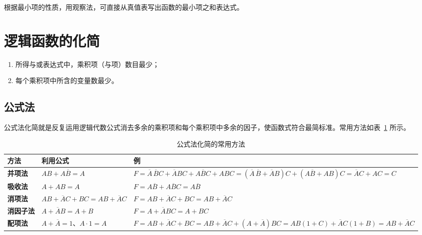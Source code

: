\begin{keybox}[方法]
	根据最小项的性质，用观察法，可直接从真值表写出函数的最小项之和表达式。
\end{keybox}

\section{逻辑函数的化简}
\label{sec:逻辑函数的化简}

\begin{keybox}[最简与或表达式的标准]
	\begin{enumerate}
		\item 所得与或表达式中，乘积项（与项）数目最少；
		\item 每个乘积项中所含的变量数最少。
	\end{enumerate}
\end{keybox}

\subsection{公式法}
\label{sec:公式法}

公式法化简就是反复运用逻辑代数公式消去多余的乘积项和每个乘积项中多余的因子，使函数式符合最简标准。常用方法如表~\ref{tab:化简:公式法} 所示。

\begin{table}[H]
\centering
\caption{公式法化简的常用方法}
\label{tab:化简:公式法}
\small
\begin{tabular}{@{}p{1.5cm}p{4.1cm}p{9.3cm}@{}}
	\toprule
	方法 & 利用公式 & 例 \\
	\midrule
	\textbf{并项法} & $AB+A\overline{B}=A$ &
	$F=\overline{A}\,\overline{B}C+\overline{A}BC+A\overline{B}C+ABC
	=(\overline{A}\,\overline{B}+\overline{A}B)C+(A\overline{B}+AB)C
	=\overline{A}C+AC=C$ \\
	\textbf{吸收法} & $A+AB=A$ &
	$F=A\overline{B}+A\overline{B}C=A\overline{B}$ \\
	\textbf{消项法} & $AB+\overline{A}C+BC=AB+\overline{A}C$ &
	$F=AB+\overline{A}C+BC=AB+\overline{A}C$ \\
	\textbf{消因子法} & $A+\overline{A}B=A+B$ &
	$F=A+\overline{A}BC=A+BC$ \\
	\textbf{配项法} & $A+\overline{A}=1$、$A\cdot1=A$ &
	$F=AB+\overline{A}C+BC=AB+\overline{A}C+(A+\overline{A})BC
	=AB(1+C)+\overline{A}C(1+B)=AB+\overline{A}C$ \\
	\bottomrule
\end{tabular}
\end{table}

